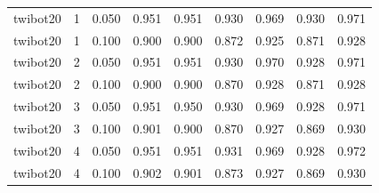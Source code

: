 \begin{tabular}{lrrrrrrrr}
twibot20 & 1 & 0.050 & 0.951 & 0.951 & 0.930 & 0.969 & 0.930 & 0.971 \\
twibot20 & 1 & 0.100 & 0.900 & 0.900 & 0.872 & 0.925 & 0.871 & 0.928 \\
twibot20 & 2 & 0.050 & 0.951 & 0.951 & 0.930 & 0.970 & 0.928 & 0.971 \\
twibot20 & 2 & 0.100 & 0.900 & 0.900 & 0.870 & 0.928 & 0.871 & 0.928 \\
twibot20 & 3 & 0.050 & 0.951 & 0.950 & 0.930 & 0.969 & 0.928 & 0.971 \\
twibot20 & 3 & 0.100 & 0.901 & 0.900 & 0.870 & 0.927 & 0.869 & 0.930 \\
twibot20 & 4 & 0.050 & 0.951 & 0.951 & 0.931 & 0.969 & 0.928 & 0.972 \\
twibot20 & 4 & 0.100 & 0.902 & 0.901 & 0.873 & 0.927 & 0.869 & 0.930 \\
\bottomrule
\end{tabular}
